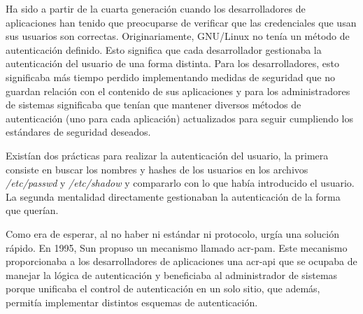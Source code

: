 \documentclass[titlepage, 12pt, a4paper]{article}
\begin{document}
Ha sido a partir de la cuarta generación cuando los desarrolladores de aplicaciones han tenido que preocuparse de verificar que las credenciales que usan sus usuarios son correctas. Originariamente, \gls{GNU/Linux} no tenía un método de autenticación definido. Esto significa que cada desarrollador gestionaba la autenticación del usuario de una forma distinta. Para los desarrolladores, esto significaba más tiempo perdido implementando medidas de seguridad que no guardan relación con el contenido de sus aplicaciones y para los administradores de sistemas significaba que tenían que mantener diversos métodos de autenticación (uno para cada aplicación) actualizados para seguir cumpliendo los estándares de seguridad deseados. \par
Existían dos prácticas para realizar la autenticación del usuario, la primera consiste en buscar los nombres y hashes de los usuarios en los archivos \textit{/etc/passwd} y \textit{/etc/shadow} y compararlo con lo que había introducido el usuario. La segunda mentalidad directamente gestionaban la autenticación de la forma que querían. \par
Como era de esperar, al no haber ni estándar ni protocolo, urgía una solución rápido. En 1995, \gls{Sun} propuso un mecanismo llamado \gls{acr-pam}. Este mecanismo proporcionaba a los desarrolladores de aplicaciones una \gls{acr-api} que se ocupaba de manejar la lógica de autenticación y beneficiaba al administrador de sistemas porque unificaba el control de autenticación en un solo sitio, que además, permitía implementar distintos esquemas de autenticación.
\end{document}
